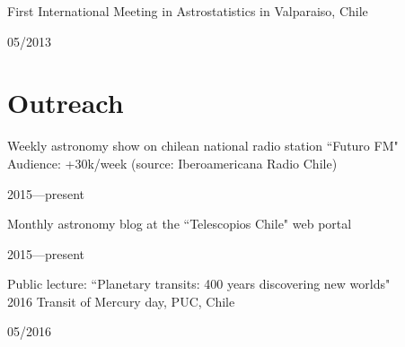\documentclass[11pt, a4paper]{article} %
\begin{document}
\begin{minipage}[t]{0.7\textwidth}
\begin{flushleft}%
  \setlength{\leftskip}{0.2cm}%
First International Meeting in Astrostatistics in Valparaiso, Chile 
\end{flushleft}
\end{minipage}
\begin{minipage}[t]{0.3\textwidth}
\hfill 05/2013
\end{minipage}

\section*{Outreach}

\begin{minipage}[t]{0.7\textwidth}
\begin{flushleft}%
  \setlength{\leftskip}{0.2cm}%
Weekly astronomy show on chilean national radio station ``Futuro FM"\\
Audience: +30k/week (source: Iberoamericana Radio Chile) 
\end{flushleft}
\end{minipage}
\begin{minipage}[t]{0.3\textwidth}
\hfill 2015---present
\end{minipage}

\vspace{0.3 cm}

\begin{minipage}[t]{0.7\textwidth}
\begin{flushleft}%
  \setlength{\leftskip}{0.2cm}%
Monthly astronomy blog at the ``Telescopios Chile" web portal
\end{flushleft}
\end{minipage}
\begin{minipage}[t]{0.3\textwidth}
\hfill 2015---present
\end{minipage}

\vspace{0.3 cm}

\begin{minipage}[t]{0.7\textwidth}
\begin{flushleft}%
  \setlength{\leftskip}{0.2cm}%
Public lecture: ``Planetary transits: 400 years discovering new worlds"\\
2016 Transit of Mercury day, PUC, Chile
\end{flushleft}
\end{minipage}
\begin{minipage}[t]{0.3\textwidth}
\hfill 05/2016
\end{minipage}
\end{document}
